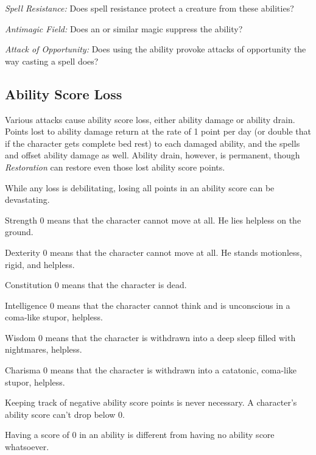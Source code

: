 \textit{Spell Resistance:} Does spell resistance protect a creature from these abilities?

\textit{Antimagic Field:} Does an  or similar magic suppress the ability?

\textit{Attack of Opportunity:} Does using the ability provoke attacks of opportunity the way casting a spell does?

\subsection{Ability Score Loss}

Various attacks cause ability score loss, either ability damage or ability drain. 
Points lost to ability damage return at the rate of 1 point per day (or double 
that if the character gets complete bed rest) to each damaged ability, and the 
spells  and  offset ability damage 
as well. Ability drain, however, is permanent, though \textit{Restoration} can 
restore even those lost ability score points.

While any loss is debilitating, losing all points in an ability score can be devastating.

\begin{itemize*}
\item Strength 0 means that the character cannot move at all. He lies helpless on the ground.
\item Dexterity 0 means that the character cannot move at all. He stands motionless, rigid, and helpless.
\item Constitution 0 means that the character is dead.
\item Intelligence 0 means that the character cannot think and is unconscious in a coma-like stupor, helpless.
\item Wisdom 0 means that the character is withdrawn into a deep sleep filled with nightmares, helpless.
\item Charisma 0 means that the character is withdrawn into a catatonic, coma-like stupor, helpless.
\end{itemize*}

Keeping track of negative ability score points is never necessary. A character's 
ability score can't drop below 0.

Having a score of 0 in an ability is different from having no ability score whatsoever.

